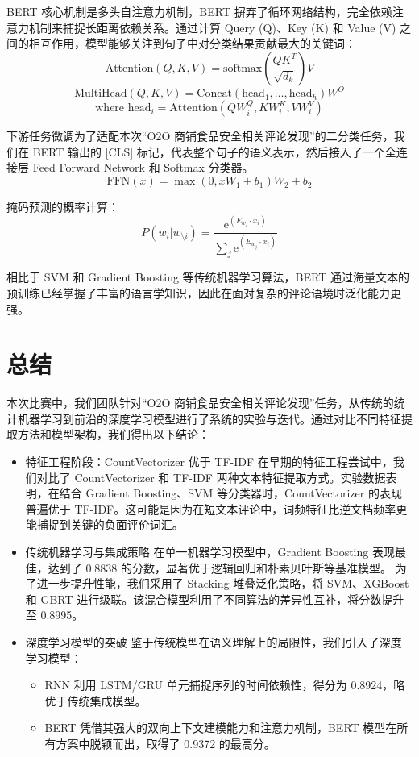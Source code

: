 \documentclass{article}
\newcommand{\e}{\mathrm{e}}
\begin{document}
BERT 核心机制是多头自注意力机制，BERT 摒弃了循环网络结构，完全依赖注意力机制来捕捉长距离依赖关系。通过计算 Query (Q)、Key (K) 和 Value (V) 之间的相互作用，模型能够关注到句子中对分类结果贡献最大的关键词：
\[ \text{Attention}(Q, K, V) = \text{softmax}\left(\frac{QK^T}{\sqrt{d_k}}\right)V \]
\[ \text{MultiHead}(Q, K, V) = \text{Concat}(\text{head}_1, \ldots, \text{head}_h)W^O \]
\[ \text{where } \text{head}_i = \text{Attention}(QW_i^Q, KW_i^K, VW_i^V) \]

下游任务微调为了适配本次“O2O 商铺食品安全相关评论发现”的二分类任务，我们在 BERT 输出的 [CLS] 标记，代表整个句子的语义表示，然后接入了一个全连接层 Feed Forward Network 和 Softmax 分类器。
\[ \text{FFN}(x) = \max\left(0, xW_1 + b_1\right)W_2 + b_2 \]

掩码预测的概率计算：
\[ P(w_i | w_{\setminus i}) = \dfrac{\e^{\displaystyle(E_{w_i} \cdot x_i)}}{\displaystyle\sum_{j} \e^{\displaystyle(E_{w_j} \cdot x_i)}} \]

相比于 SVM 和 Gradient Boosting 等传统机器学习算法，BERT 通过海量文本的预训练已经掌握了丰富的语言学知识，因此在面对复杂的评论语境时泛化能力更强。



\section{总结}
本次比赛中，我们团队针对“O2O 商铺食品安全相关评论发现”任务，从传统的统计机器学习到前沿的深度学习模型进行了系统的实验与迭代。通过对比不同特征提取方法和模型架构，我们得出以下结论：

\begin{itemize}
    \item 特征工程阶段：CountVectorizer 优于 TF-IDF 在早期的特征工程尝试中，我们对比了 CountVectorizer 和 TF-IDF 两种文本特征提取方式。实验数据表明，在结合 Gradient Boosting、SVM 等分类器时，CountVectorizer 的表现普遍优于 TF-IDF。这可能是因为在短文本评论中，词频特征比逆文档频率更能捕捉到关键的负面评价词汇。
    \item 传统机器学习与集成策略 在单一机器学习模型中，Gradient Boosting 表现最佳，达到了 0.8838 的分数，显著优于逻辑回归和朴素贝叶斯等基准模型。 为了进一步提升性能，我们采用了 Stacking 堆叠泛化策略，将 SVM、XGBoost 和 GBRT 进行级联。该混合模型利用了不同算法的差异性互补，将分数提升至 0.8995。
    \item 深度学习模型的突破 鉴于传统模型在语义理解上的局限性，我们引入了深度学习模型：
    \begin{itemize}
        \item RNN 利用 LSTM/GRU 单元捕捉序列的时间依赖性，得分为 0.8924，略优于传统集成模型。
        \item BERT 凭借其强大的双向上下文建模能力和注意力机制，BERT 模型在所有方案中脱颖而出，取得了 0.9372 的最高分。
    \end{itemize}
\end{itemize}
\end{document}
